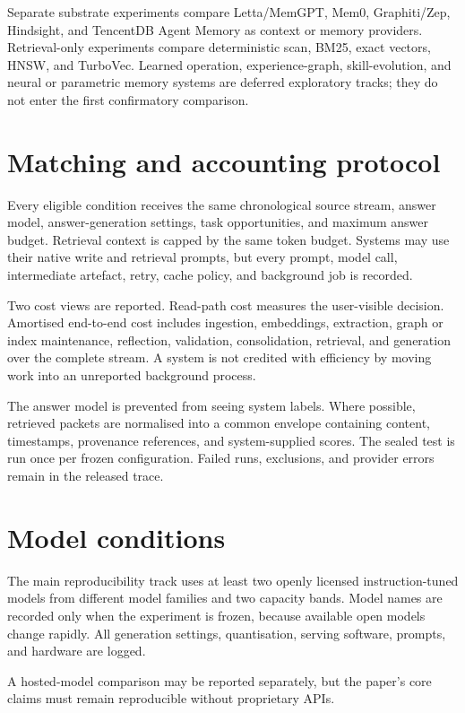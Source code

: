 \documentclass[
  english,
  a4paper,
  DIV=11,
  numbers=noendperiod]{scrreprt}
\begin{document}
Separate substrate experiments compare Letta/MemGPT, Mem0, Graphiti/Zep,
Hindsight, and TencentDB Agent Memory as context or memory providers.
Retrieval-only experiments compare deterministic scan, BM25, exact
vectors, HNSW, and TurboVec. Learned operation, experience-graph,
skill-evolution, and neural or parametric memory systems are deferred
exploratory tracks; they do not enter the first confirmatory comparison.

\section{Matching and accounting
protocol}\label{matching-and-accounting-protocol}

Every eligible condition receives the same chronological source stream,
answer model, answer-generation settings, task opportunities, and
maximum answer budget. Retrieval context is capped by the same token
budget. Systems may use their native write and retrieval prompts, but
every prompt, model call, intermediate artefact, retry, cache policy,
and background job is recorded.

Two cost views are reported. Read-path cost measures the user-visible
decision. Amortised end-to-end cost includes ingestion, embeddings,
extraction, graph or index maintenance, reflection, validation,
consolidation, retrieval, and generation over the complete stream. A
system is not credited with efficiency by moving work into an unreported
background process.

The answer model is prevented from seeing system labels. Where possible,
retrieved packets are normalised into a common envelope containing
content, timestamps, provenance references, and system-supplied scores.
The sealed test is run once per frozen configuration. Failed runs,
exclusions, and provider errors remain in the released trace.

\section{Model conditions}\label{model-conditions}

The main reproducibility track uses at least two openly licensed
instruction-tuned models from different model families and two capacity
bands. Model names are recorded only when the experiment is frozen,
because available open models change rapidly. All generation settings,
quantisation, serving software, prompts, and hardware are logged.

A hosted-model comparison may be reported separately, but the paper's
core claims must remain reproducible without proprietary APIs.
\end{document}
